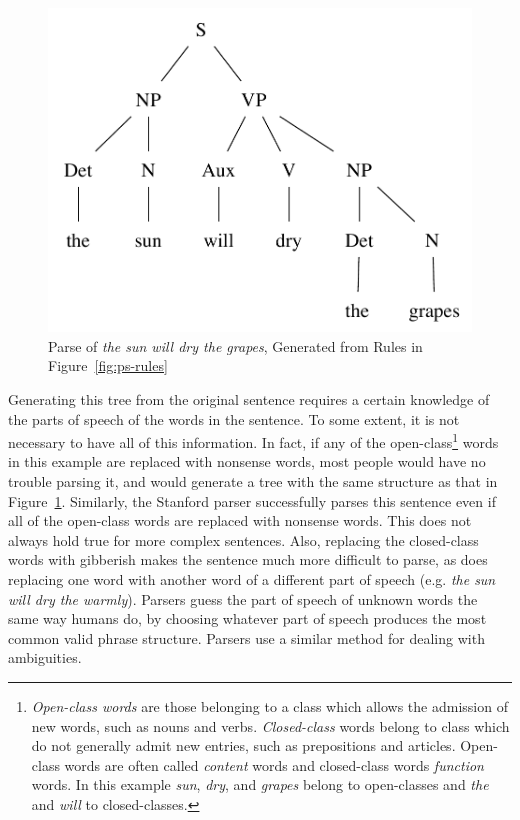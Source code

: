 \documentclass[main.tex]{subfiles}
\begin{document}
\begin{figure}[htbp]
\centering
\includegraphics[scale=0.6]{ps-tree.pdf}
\caption{Parse of \textit{the sun will dry the grapes}, Generated from Rules in Figure~\ref{fig:ps-rules}}
\label{fig:ps-tree}
\end{figure}
Generating this tree from the original sentence requires a certain knowledge of the parts of speech of the words in the sentence. To some extent, it is not necessary to have all of this information. In fact, if any of the open-class\footnote{\textit{Open-class words} are those belonging to a class which allows the admission of new words, such as nouns and verbs. \textit{Closed-class} words belong to class which do not generally admit new entries, such as prepositions and articles. Open-class words are often called \textit{content} words and closed-class words \textit{function} words. In this example \textit{sun}, \textit{dry}, and \textit{grapes} belong to open-classes and \textit{the} and \textit{will} to closed-classes.} words in this example are replaced with nonsense words, most people would have no trouble parsing it, and would generate a tree with the same structure as that in Figure~\ref{fig:ps-tree}. Similarly, the Stanford parser successfully parses this sentence even if all of the open-class words are replaced with nonsense words. This does not always hold true for more complex sentences. Also, replacing the closed-class words with gibberish makes the sentence much more difficult to parse, as does replacing one word with another word of a different part of speech (e.g. \textit{the sun will dry the warmly}). Parsers guess the part of speech of unknown words the same way humans do, by choosing whatever part of speech produces the most common valid phrase structure. Parsers use a similar method for dealing with ambiguities.
\end{document}
